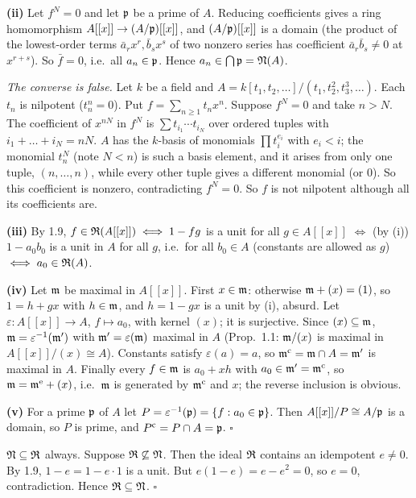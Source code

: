 \documentclass[11pt]{article}
\begin{document}
\textbf{(ii)} Let $f^N=0$ and let $\mathfrak p$ be a prime of $A$. Reducing coefficients gives a ring homomorphism $A[[x]]\to(A/\mathfrak p)[[x]]$, and $(A/\mathfrak p)[[x]]$ is a domain (the product of the lowest-order terms $\bar a_rx^r,\bar b_sx^s$ of two nonzero series has coefficient $\bar a_r\bar b_s\ne0$ at $x^{r+s}$). So $\bar f=0$, i.e.\ all $a_n\in\mathfrak p$. Hence $a_n\in\bigcap\mathfrak p=\mathfrak N(A)$.

\emph{The converse is false.} Let $k$ be a field and $A=k[t_1,t_2,\dots]/(t_1,t_2^2,t_3^3,\dots)$. Each $t_n$ is nilpotent ($t_n^n=0$). Put $f=\sum_{n\ge1}t_nx^n$. Suppose $f^N=0$ and take $n>N$. The coefficient of $x^{nN}$ in $f^N$ is $\sum t_{i_1}\cdots t_{i_N}$ over ordered tuples with $i_1+\dots+i_N=nN$. $A$ has the $k$-basis of monomials $\prod t_i^{e_i}$ with $e_i<i$; the monomial $t_n^N$ (note $N<n$) is such a basis element, and it arises from only one tuple, $(n,\dots,n)$, while every other tuple gives a different monomial (or $0$). So this coefficient is nonzero, contradicting $f^N=0$. So $f$ is not nilpotent although all its coefficients are.

\textbf{(iii)} By 1.9, $f\in\mathfrak R(A[[x]])\iff1-fg$ is a unit for all $g\in A[[x]]$ $\iff$ (by (i)) $1-a_0b_0$ is a unit in $A$ for all $g$, i.e.\ for all $b_0\in A$ (constants are allowed as $g$) $\iff a_0\in\mathfrak R(A)$.

\textbf{(iv)} Let $\mathfrak m$ be maximal in $A[[x]]$. First $x\in\mathfrak m$: otherwise $\mathfrak m+(x)=(1)$, so $1=h+gx$ with $h\in\mathfrak m$, and $h=1-gx$ is a unit by (i), absurd. Let $\varepsilon:A[[x]]\to A$, $f\mapsto a_0$, with kernel $(x)$; it is surjective. Since $(x)\subseteq\mathfrak m$, $\mathfrak m=\varepsilon^{-1}(\mathfrak m')$ with $\mathfrak m'=\varepsilon(\mathfrak m)$ maximal in $A$ (Prop.~1.1: $\mathfrak m/(x)$ is maximal in $A[[x]]/(x)\cong A$). Constants satisfy $\varepsilon(a)=a$, so $\mathfrak m^{\mathrm{c}}=\mathfrak m\cap A=\mathfrak m'$ is maximal in $A$. Finally every $f\in\mathfrak m$ is $a_0+xh$ with $a_0\in\mathfrak m'=\mathfrak m^{\mathrm{c}}$, so $\mathfrak m=\mathfrak m^{\mathrm{e}}+(x)$, i.e.\ $\mathfrak m$ is generated by $\mathfrak m^{\mathrm{c}}$ and $x$; the reverse inclusion is obvious.

\textbf{(v)} For a prime $\mathfrak p$ of $A$ let $P=\varepsilon^{-1}(\mathfrak p)=\{f:a_0\in\mathfrak p\}$. Then $A[[x]]/P\cong A/\mathfrak p$ is a domain, so $P$ is prime, and $P^{\mathrm{c}}=P\cap A=\mathfrak p$. \hfill$\square$

\pf
$\mathfrak N\subseteq\mathfrak R$ always. Suppose $\mathfrak R\not\subseteq\mathfrak N$. Then the ideal $\mathfrak R$ contains an idempotent $e\ne0$. By 1.9, $1-e=1-e\cdot1$ is a unit. But $e(1-e)=e-e^2=0$, so $e=0$, contradiction. Hence $\mathfrak R\subseteq\mathfrak N$. \hfill$\square$
\end{document}
